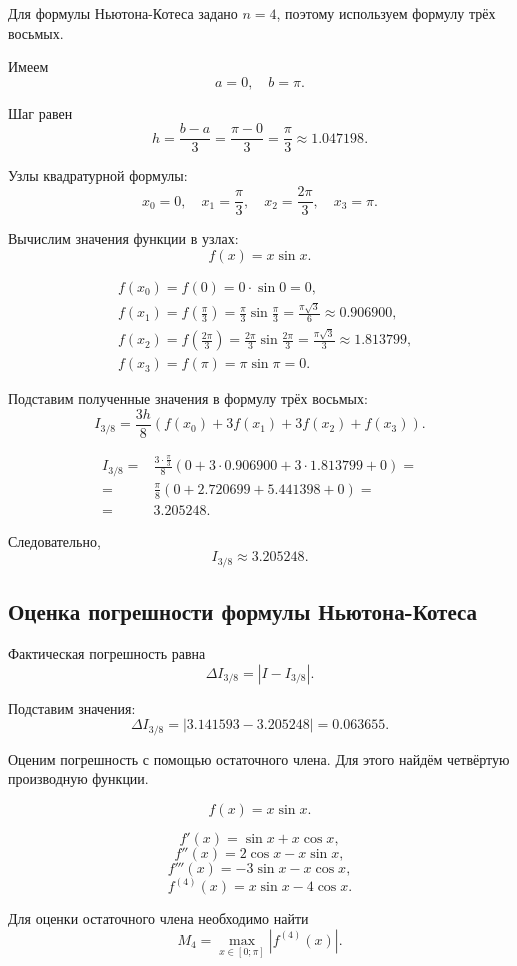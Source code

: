 Для формулы Ньютона-Котеса задано $n=4$, поэтому используем формулу трёх восьмых.

Имеем
\[
a=0, \quad b=\pi.
\]

Шаг равен
\[
h=\frac{b-a}{3}=\frac{\pi-0}{3}=\frac{\pi}{3}\approx 1.047198.
\]

Узлы квадратурной формулы:
\[
x_0=0, \quad x_1=\frac{\pi}{3}, \quad x_2=\frac{2\pi}{3}, \quad x_3=\pi.
\]

Вычислим значения функции в узлах:
\[
f(x)=x\sin x.
\]

\[
\begin{aligned}
&f(x_0)=f(0)=0\cdot\sin0=0,\\
&f(x_1)=f\left(\frac{\pi}{3}\right)=\frac{\pi}{3}\sin\frac{\pi}{3}=\frac{\pi\sqrt3}{6}\approx0.906900,\\
&f(x_2)=f\left(\frac{2\pi}{3}\right)=\frac{2\pi}{3}\sin\frac{2\pi}{3}=\frac{\pi\sqrt3}{3}\approx1.813799,\\
&f(x_3)=f(\pi)=\pi\sin\pi=0.
\end{aligned}
\]

Подставим полученные значения в формулу трёх восьмых:
\[
I_{3/8}=\frac{3h}{8}\left(f(x_0)+3f(x_1)+3f(x_2)+f(x_3)\right).
\]

\[
\begin{aligned}
I_{3/8}={}&\frac{3\cdot\frac{\pi}{3}}{8}
\left(0+3\cdot0.906900+3\cdot1.813799+0\right)=\\
={}&\frac{\pi}{8}(0+2.720699+5.441398+0)=\\
={}&3.205248.
\end{aligned}
\]

Следовательно,
\[
I_{3/8}\approx3.205248.
\]

\subsection{Оценка погрешности формулы Ньютона-Котеса}

Фактическая погрешность равна
\[
\Delta I_{3/8}=|I-I_{3/8}|.
\]

Подставим значения:
\[
\Delta I_{3/8}=|3.141593-3.205248|=0.063655.
\]

Оценим погрешность с помощью остаточного члена. Для этого найдём четвёртую производную функции.

\[
f(x)=x\sin x.
\]

\[
f'(x)=\sin x+x\cos x,
\]
\[
f''(x)=2\cos x-x\sin x,
\]
\[
f'''(x)=-3\sin x-x\cos x,
\]
\[
f^{(4)}(x)=x\sin x-4\cos x.
\]

Для оценки остаточного члена необходимо найти
\[
M_4=\max_{x\in[0;\pi]} |f^{(4)}(x)|.
\]

